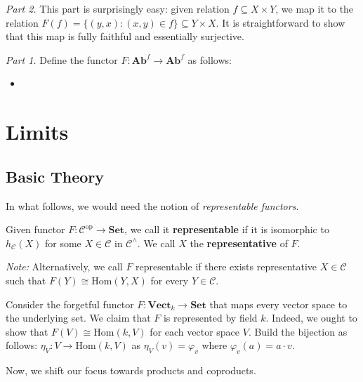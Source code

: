 \documentclass{category-template}
\begin{document}
\textit{Part 2.} This part is surprisingly easy: given relation $f \subseteq X
\times Y$, we map it to the relation $F(f) = \{(y,x): (x,y) \in f\} \subseteq Y
\times X$. It is straightforward to show that this map is fully faithful and 
essentially surjective.

\textit{Part 1.} Define the functor $F: \textbf{Ab}^f \to \textbf{Ab}^f$ as 
follows:
\begin{itemize}
    \item 
\end{itemize}

\section{Limits}

\subsection{Basic Theory}

In what follows, we would need the notion of \textit{representable functors}.

\begin{definition}
    Given functor $F: \mathcal{C}^{\text{op}} \to \textbf{Set}$, we call it
    \textbf{representable} if it is isomorphic to $h_{\mathcal{C}}(X)$ for some
    $X \in \mathcal{C}$ in $\mathcal{C}^{\wedge}$. We call $X$ the
    \textbf{representative} of $F$.

    \textit{Note:} Alternatively, we call $F$ representable if there exists
    representative $X \in \mathcal{C}$ such that $F(Y) \cong \text{Hom}(Y,X)$
    for every $Y \in \mathcal{C}$.
\end{definition}

\begin{example}
    Consider the forgetful functor $F: \textbf{Vect}_{k} \to \textbf{Set}$ that
    maps every vector space to the underlying set. We claim that $F$ is
    represented by field $k$. Indeed, we ought to show that $F(V) \cong
    \text{Hom}(k,V)$ for each vector space $V$. Build the bijection as follows:
    $\eta_V: V \to \text{Hom}(k,V)$ as $\eta_V(v) = \varphi_v$ where
    $\varphi_v(a) = a \cdot v$.
\end{example}

Now, we shift our focus towards products and coproducts. 
\end{document}
